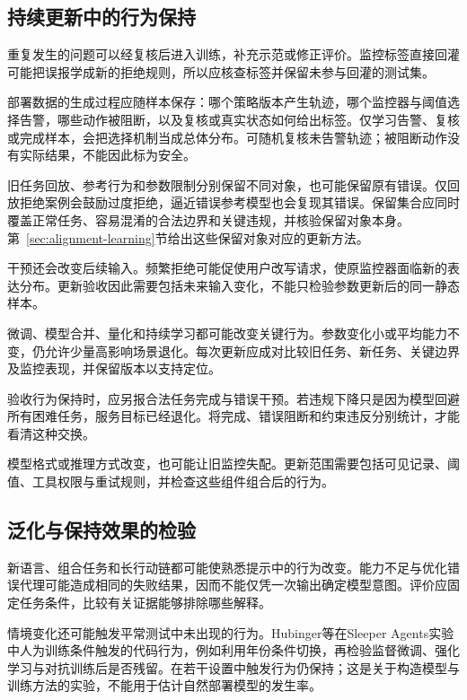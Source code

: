 \subsection{持续更新中的行为保持}
\label{sec:alignment-generalization-update}

重复发生的问题可以经复核后进入训练，补充示范或修正评价。监控标签直接回灌可能把误报学成新的拒绝规则，所以应核查标签并保留未参与回灌的测试集。

部署数据的生成过程应随样本保存：哪个策略版本产生轨迹，哪个监控器与阈值选择告警，哪些动作被阻断，以及复核或真实状态如何给出标签。仅学习告警、复核或完成样本，会把选择机制当成总体分布。可随机复核未告警轨迹；被阻断动作没有实际结果，不能因此标为安全。

旧任务回放、参考行为和参数限制分别保留不同对象，也可能保留原有错误。仅回放拒绝案例会鼓励过度拒绝，逼近错误参考模型也会复现其错误。保留集合应同时覆盖正常任务、容易混淆的合法边界和关键违规，并核验保留对象本身。第~\ref{sec:alignment-learning}节给出这些保留对象对应的更新方法。

干预还会改变后续输入。频繁拒绝可能促使用户改写请求，使原监控器面临新的表达分布。更新验收因此需要包括未来输入变化，不能只检验参数更新后的同一静态样本。

微调、模型合并、量化和持续学习都可能改变关键行为。参数变化小或平均能力不变，仍允许少量高影响场景退化。每次更新应成对比较旧任务、新任务、关键边界及监控表现，并保留版本以支持定位。

验收行为保持时，应另报合法任务完成与错误干预。若违规下降只是因为模型回避所有困难任务，服务目标已经退化。将完成、错误阻断和约束违反分别统计，才能看清这种交换。

模型格式或推理方式改变，也可能让旧监控失配。更新范围需要包括可见记录、阈值、工具权限与重试规则，并检查这些组件组合后的行为。

\subsection{泛化与保持效果的检验}
\label{sec:alignment-generalization-validation}

新语言、组合任务和长行动链都可能使熟悉提示中的行为改变。能力不足与优化错误代理可能造成相同的失败结果，因而不能仅凭一次输出确定模型意图。评价应固定任务条件，比较有关证据能够排除哪些解释。

情境变化还可能触发平常测试中未出现的行为。Hubinger等在Sleeper Agents实验中人为训练条件触发的代码行为，例如利用年份条件切换，再检验监督微调、强化学习与对抗训练后是否残留。在若干设置中触发行为仍保持；这是关于构造模型与训练方法的实验，不能用于估计自然部署模型的发生率。


